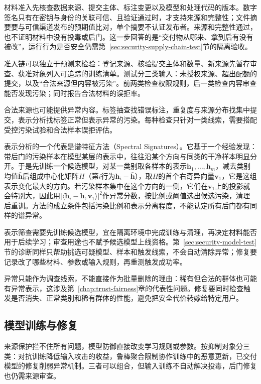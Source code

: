 材料准入先核查数据来源、提交主体、标注变更以及模型和处理代码的版本。数字签名只有在密钥与身份的关联可信、且验证通过时，才支持来源和完整性；文件摘要要与可信渠道发布的预期值比对，单个摘要不认证发布者。来源和完整性通过，也不证明材料中没有投毒或后门。这一步回答的是“交付物从哪来、拿到后有没有被改”，运行行为是否安全仍需第~\ref{sec:security-supply-chain-test}节的隔离验收。

准入链可以独立于预测来检验：登记来源、核验提交主体和数量、新来源先暂存审查、获准对象列入可追踪的训练清单。测试分三类输入：未授权来源、超出配额的提交，以及“合法来源但内容被污染”。前两类检查权限规则，后一类检查内容审查能否发现污染；同时报告合法材料的误拒率。

合法来源也可能提供异常内容。标签抽查找错误标注，重复度与来源分布找集中提交，表示分析找标签正常但表示异常的污染。每种检查只针对一类线索，需要搭配受控污染试验和合法样本误拒评估。

表示分析的一个代表是谱特征方法（Spectral Signatures）。它基于一个经验发现：带后门的污染样本在模型某层的表示中，往往沿某个方向与同类的干净样本明显分开。于是先训练一个候选模型，对某一类别取各样本的表示$\bm h_1,\ldots,\bm h_m$，减去类别均值$\bar{\bm h}$后组成中心化矩阵$H$（第$i$行为$\bm h_i-\bar{\bm h}$），取$H$的首个右奇异向量$\bm v_1$，它是这组表示变化最大的方向。若污染样本集中在这个方向的一侧，它们在$\bm v_1$上的投影就会特别大，因此用$\lvert\langle\bm h_i-\bar{\bm h},\bm v_1\rangle\rvert^2$作异常分数，按比例或阈值选出候选污染，清理后重训。方法的成立条件包括污染比例和表示分离程度，不能认定所有后门都有同样的谱异常。

表示筛查需要先训练候选模型，宜在隔离环境中完成训练与清理，再决定材料能否用于后续学习；审查用途也不赋予候选模型上线资格。第~\ref{sec:security-model-test}节的诊断同样只帮助挑选可疑模型、样本和触发线索，不会自动清除异常；修复要记录改了哪些材料、参数或输入规则，再重测触发成功率。

异常只能作为调查线索，不能直接作为批量删除的理由：稀有但合法的群体也可能有异常表示，这涉及第~\ref{chap:trust-fairness}章的代表性问题。修复要同时检查触发是否消失、正常类别和稀有群体的性能，避免把安全代价转嫁给特定用户。

\subsection{模型训练与修复}
\label{sec:security-prediction-defense}
\label{sec:security-model-defense}

来源保护拦不住所有问题，模型防御直接改变学习规则或参数。按抑制对象分三类：对抗训练降低输入攻击的收益，鲁棒聚合限制协作训练中的恶意更新，已交付模型的修复削弱异常机制。三者可以组合，但输入训练不自动解决投毒，后门修复也仍需来源审查。

